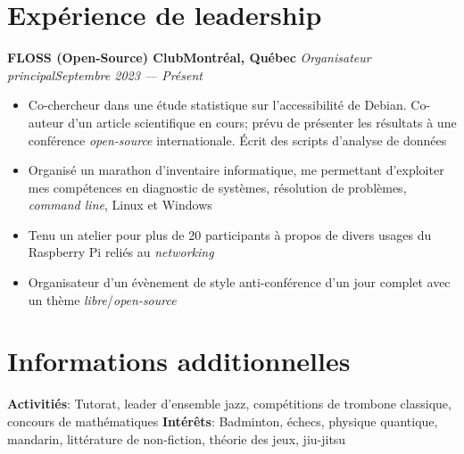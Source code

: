 \documentclass{article}
\newcommand{\newrole}[4]{
    {\normalfont\bfseries #1\hfill#3}
    \newline
    \textit{#2}\hfill\textit{#4}
}
\newenvironment{bulletpoints}{\vspace*{-0.2em}\begin{itemize}\setlength\itemsep{-0.3em}}{\end{itemize}}
\begin{document}
\section*{Expérience de leadership}
\newrole{FLOSS (Open-Source) Club}{Organisateur principal}{Montréal, Québec}{Septembre 2023 --- Présent}
\begin{bulletpoints}
    \item Co-chercheur dans une étude statistique sur l'accessibilité de Debian. Co-auteur d'un article scientifique en cours; prévu de présenter les résultats à une conférence \emph{open-source} internationale. Écrit des scripts d'analyse de données
    \item Organisé un marathon d'inventaire informatique, me permettant d'exploiter mes compétences en diagnostic de systèmes, résolution de problèmes, \textit{command line}, Linux et Windows
    \item Tenu un atelier pour plus de 20 participants à propos de divers usages du Raspberry Pi reliés au \textit{networking}
    \item Organisateur d'un évènement de style anti-conférence d'un jour complet avec un thème \textit{libre}/\textit{open-source}

\end{bulletpoints}


\section*{Informations additionnelles}
{\bfseries Activitiés}: Tutorat, leader d'ensemble jazz, compétitions de trombone classique, concours de mathématiques
\newline
{\bfseries Intérêts}: Badminton, échecs, physique quantique, mandarin, littérature de non-fiction, théorie des jeux, jiu-jitsu
\end{document}
